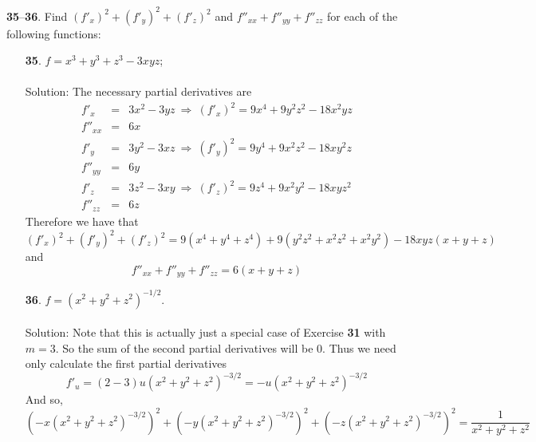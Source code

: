 \documentclass[12pt]{amsbook}
\begin{document}
\noindent
{\small {\bf 35}--{\bf 36}}. Find $(f'_x)^2+(f'_y)^2+(f'_z)^2$ and $f''_{xx}+f''_{yy}+f''_{zz}$ for each of the following
functions:
\begin{enumerate}
\item[{\small\bf 35}.] $f=x^3+y^3+z^3-3xyz$;
\\
\\
{\sc Solution}: The necessary partial derivatives are
\begin{eqnarray*}
f'_x&=&3x^2-3yz  \ \Rightarrow \ (f'_x)^2=9x^4+9y^2z^2-18x^2yz \\
f''_{xx}&=&6x \\
f'_y&=&3y^2-3xz \ \Rightarrow \ (f'_y)^2=9y^4+9x^2z^2-18xy^2z \\
f''_{yy}&=&6y \\
f'_z&=&3z^2-3xy \ \Rightarrow \ (f'_z)^2=9z^4+9x^2y^2-18xyz^2 \\
f''_{zz}&=&6z 
\end{eqnarray*}
Therefore we have that
$$(f'_x)^2+(f'_y)^2+(f'_z)^2=9(x^4+y^4+z^4)+9(y^2z^2+x^2z^2+x^2y^2)-18xyz(x+y+z)$$
and 
$$f''_{xx}+f''_{yy}+f''_{zz}=6(x+y+z)$$
\item[{\small\bf 36}.] $f=(x^2+y^2+z^2)^{-1/2}$.
\\
\\
{\sc Solution}: Note that this is actually just a special case of Exercise {\bf 31} with $m=3$. So the sum of the second partial derivatives will be $0$. Thus we need only calculate the first partial derivatives
$$f'_u=(2-3)u(x^2+y^2+z^2)^{-3/2}=-u(x^2+y^2+z^2)^{-3/2}$$
And so,
$$(-x(x^2+y^2+z^2)^{-3/2})^2+(-y(x^2+y^2+z^2)^{-3/2})^2+(-z(x^2+y^2+z^2)^{-3/2})^2=\frac{1}{x^2+y^2+z^2}$$
\end{enumerate}
\end{document}
